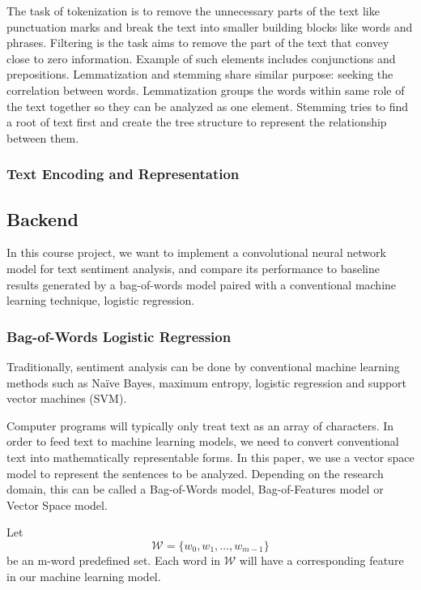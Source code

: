 \documentclass[conference]{IEEEtran}
\begin{document}
    The task of tokenization is to remove the unnecessary parts of the text like 
    punctuation marks and break the text into smaller building blocks like words and 
    phrases\cite{webster1992tokenization}. 
    Filtering is the task aims to remove the part of the text that convey close to zero 
    information. Example of such elements includes conjunctions and 
    prepositions\cite{silva2003importance}.
    Lemmatization and stemming share similar purpose: seeking the correlation between words.
    Lemmatization groups the words within same role of the text together so they can be 
    analyzed as one element. Stemming tries to find a root of text first and create the tree
    structure to represent the relationship between them\cite{hull1996stemming}.
\subsubsection{Text Encoding and Representation}


\subsection{Backend}
\label{model:back}
    In this course project, we want to implement a convolutional neural network
    model for text sentiment analysis, and compare its performance to baseline results
    generated by a bag-of-words model paired with a conventional machine learning
    technique, logistic regression.
    
\subsubsection{Bag-of-Words Logistic Regression}
\label{model:back:bow}
    Traditionally, sentiment analysis can be done by conventional machine learning
    methods such as Na\"ive Bayes, maximum entropy, logistic regression and 
    support vector machines (SVM). 
    
    Computer programs will typically only treat text as an array of characters.
    In order to feed text to machine learning models, we need to 
    convert conventional text into mathematically representable forms. In this
    paper, we use a vector space model to represent the sentences to be analyzed.
    Depending on the research domain, this can be called a Bag-of-Words model, 
    Bag-of-Features model or Vector Space model\cite{salton1975vector}.
    
    Let $$\mathcal{W}=\{w_0, w_1,\ldots, w_{m-1}\}$$ be an m-word predefined set. Each 
    word in $\mathcal{W}$ will have a corresponding feature in our machine learning model.
    
\end{document}
